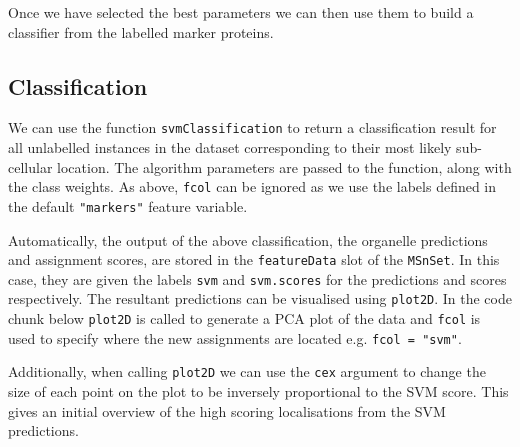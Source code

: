 Once we have selected the best parameters we can then use them to
build a classifier from the labelled marker proteins.


\subsection*{Classification}

We can use the function \texttt{svmClassification} to return a classification
result for all unlabelled instances in the dataset corresponding to
their most likely sub-cellular location. The algorithm parameters are
passed to the function, along with the class weights. As above, \texttt{fcol}
can be ignored as we use the labels defined in the default \texttt{"markers"}
feature variable.

\begin{knitrout}
\color{fgcolor}\begin{kframe}
\begin{alltt}
 \hlkwb{<-}     \hlstd{=} \hlstd{)}
\end{alltt}
\end{kframe}
\end{knitrout}

Automatically, the output of the above classification, the organelle
predictions and assignment scores, are stored in the
\texttt{featureData} slot of the \texttt{MSnSet}. In this case, they
are given the labels \texttt{svm} and \texttt{svm.scores} for the
predictions and scores respectively. The resultant predictions can be
visualised using \texttt{plot2D}. In the code chunk below
\texttt{plot2D} is called to generate a PCA plot of the data and
\texttt{fcol} is used to specify where the new assignments are located
e.g.  \texttt{fcol = "svm"}.

Additionally, when calling \texttt{plot2D} we can use the \texttt{cex}
argument to change the size of each point on the plot to be inversely
proportional to the SVM score. This gives an initial overview of the
high scoring localisations from the SVM predictions.



